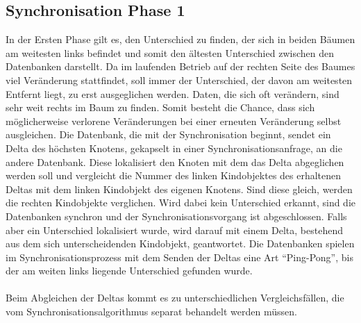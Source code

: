 \documentclass[a4paper,11pt,oneside,%
headsepline,												%
footsepline,												%
bibtotocnumbered									%
]{scrreprt}
\begin{document}
\subsection{Synchronisation Phase 1} 
In der Ersten Phase gilt es, den Unterschied zu finden, der sich in beiden Bäumen am weitesten links befindet und somit den ältesten Unterschied zwischen den Datenbanken darstellt. Da im laufenden Betrieb auf der rechten Seite des Baumes viel Veränderung stattfindet, soll immer der Unterschied, der davon am weitesten Entfernt liegt, zu erst ausgeglichen werden. Daten, die sich oft verändern, sind sehr weit rechts im Baum zu finden. Somit besteht die Chance, dass sich möglicherweise verlorene Veränderungen bei einer erneuten Veränderung selbst ausgleichen.
Die Datenbank, die mit der Synchronisation beginnt, sendet ein Delta des höchsten Knotens, gekapselt in einer Synchronisationsanfrage, an die andere Datenbank. Diese lokalisiert den Knoten mit dem das Delta abgeglichen werden soll und vergleicht die Nummer des linken Kindobjektes des erhaltenen Deltas mit dem linken Kindobjekt des eigenen Knotens. Sind diese gleich, werden die rechten Kindobjekte verglichen. Wird dabei kein Unterschied erkannt, sind die Datenbanken synchron und der Synchronisationsvorgang ist abgeschlossen. Falls aber ein Unterschied lokalisiert wurde, wird darauf mit einem Delta, bestehend aus dem sich unterscheidenden Kindobjekt, geantwortet. Die Datenbanken spielen im Synchronisationsprozess mit dem Senden der Deltas eine Art \enquote{Ping-Pong}, bis der am weiten links liegende Unterschied gefunden wurde.\\\\
Beim Abgleichen der Deltas kommt es zu unterschiedlichen Vergleichsfällen, die vom Synchronisationsalgorithmus separat behandelt werden müssen.
\end{document}
